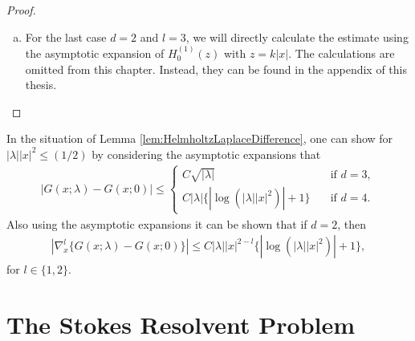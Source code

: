 \begin{proof}
\begin{enumerate}[(a)]
  \item For the last case $d = 2$ and $l = 3$, we will directly calculate the estimate using the asymptotic expansion of $H_0^{(1)}(z)$ with $z = k|x|$. The calculations are omitted from this chapter. Instead, they can be found in the appendix of this thesis. \qedhere
%
  \end{enumerate} 
\end{proof}

\begin{rem}
  \label{rem:HelmholtzLaplaceDifference}
  In the situation of Lemma \ref{lem:HelmholtzLaplaceDifference}, one can show for $|\lambda| |x|^2 \leq (1/2)$ by considering the asymptotic expansions that 
  \begin{align*}
    |G(x; \lambda) - G(x; 0) | \leq \begin{cases}
      C \sqrt{|\lambda|} \quad&\text{if } d = 3, \\
      C |\lambda| \{ |\log(|\lambda| |x|^2) | + 1 \} \quad&\text{if } d = 4.
    \end{cases}
  \end{align*}
  Also using the asymptotic expansions it can be shown that if $d = 2$, then
  \begin{align*}
    |\nabla_x^l \{ G(x; \lambda) - G(x; 0) \} | \leq C |\lambda| |x|^{2 - l} \{ |\log(|\lambda| |x|^2 ) | + 1 \},
  \end{align*}
  for $l \in \{1, 2\}$.  
\end{rem}

\section{The Stokes Resolvent Problem}

